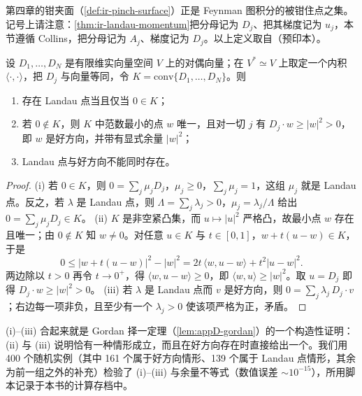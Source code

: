 第四章的钳夹面（\cref{def:ir-pinch-surface}）正是 Feynman 图积分的被钳住点之集。记号上请注意：\cref{thm:ir-landau-momentum}把分母记为 $D_j$、把其梯度记为 $u_j$，本节遵循 Collins，把分母记为 $A_j$、梯度记为 $D_j$。以上定义取自\cite[第~II~节，定义~1--7、15]{Collins:2020euz}（预印本）。

\begin{lemma}\label{lem:front-min-norm}
设 $D_1,\dots,D_N$ 是有限维实向量空间 $V$ 上的对偶向量；在 $V^*\simeq V$ 上取定一个内积 $\langle\cdot,\cdot\rangle$，把 $D_j$ 与向量等同，令 $K=\mathrm{conv}\{D_1,\dots,D_N\}$。则
\begin{enumerate}[label=(\roman*),leftmargin=2.2em,itemsep=0pt,topsep=2pt]
\item 存在 Landau 点当且仅当 $0\in K$；
\item 若 $0\notin K$，则 $K$ 中范数最小的点 $w$ 唯一，且对一切 $j$ 有 $D_j\cdot w\ge|w|^2>0$，即 $w$ 是好方向，并带有显式余量 $|w|^2$；
\item Landau 点与好方向不能同时存在。
\end{enumerate}
\end{lemma}

\begin{proof}
(i) 若 $0\in K$，则 $0=\sum_j\mu_jD_j$，$\mu_j\ge0$，$\sum_j\mu_j=1$，这组 $\mu_j$ 就是 Landau 点。反之，若 $\lambda$ 是 Landau 点，则 $\Lambda=\sum_j\lambda_j>0$，$\mu_j=\lambda_j/\Lambda$ 给出 $0=\sum_j\mu_jD_j\in K$。
(ii) $K$ 是非空紧凸集，而 $u\mapsto|u|^2$ 严格凸，故最小点 $w$ 存在且唯一；由 $0\notin K$ 知 $w\neq0$。对任意 $u\in K$ 与 $t\in[0,1]$，$w+t(u-w)\in K$，于是
\begin{equation*}
0\le|w+t(u-w)|^2-|w|^2=2t\,\langle w,u-w\rangle+t^2|u-w|^2 .
\end{equation*}
两边除以 $t>0$ 再令 $t\to0^+$，得 $\langle w,u-w\rangle\ge0$，即 $\langle w,u\rangle\ge|w|^2$。取 $u=D_j$ 即得 $D_j\cdot w\ge|w|^2>0$。
(iii) 若 $\lambda$ 是 Landau 点而 $v$ 是好方向，则 $0=\sum_j\lambda_j\,D_j\cdot v$；右边每一项非负，且至少有一个 $\lambda_j>0$ 使该项严格为正，矛盾。
\end{proof}

(i)--(iii) 合起来就是 Gordan 择一定理（\cref{lem:appD-gordan}）的一个构造性证明：(ii) 与 (iii) 说明恰有一种情形成立，而且在好方向存在时直接给出一个。我们用 400 个随机实例（其中 161 个属于好方向情形、139 个属于 Landau 点情形，其余为前一组之外的补充）检验了 (i)--(iii) 与余量不等式（数值误差 $\sim10^{-15}$），所用脚本记录于本书的计算存档中。

